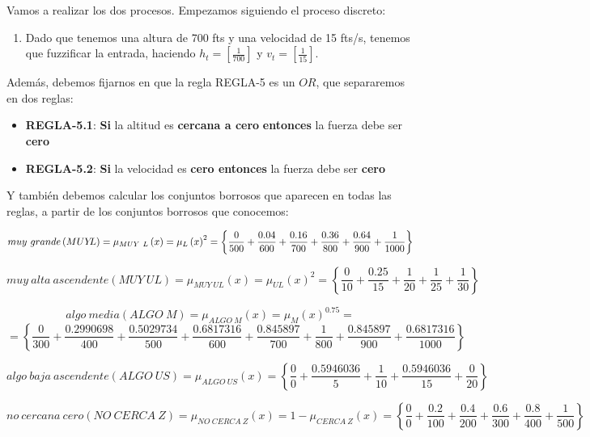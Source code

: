 \documentclass[
]{article}
\providecommand{\tightlist}{%
  \setlength{\itemsep}{0pt}\setlength{\parskip}{0pt}}
\begin{document}
Vamos a realizar los dos procesos. Empezamos siguiendo el proceso
discreto:

\begin{enumerate}
\def\labelenumi{\arabic{enumi}.}
\tightlist
\item
  Dado que tenemos una altura de 700 fts y una velocidad de 15 fts/s,
  tenemos que fuzzificar la entrada, haciendo
  \(h_{t}=\left[\frac{1}{700}\right]\) y
  \(v_{t}=\left[\frac{1}{15}\right]\).
\end{enumerate}

Además, debemos fijarnos en que la regla REGLA-5 es un \(OR\), que
separaremos en dos reglas:

\begin{itemize}
\tightlist
\item
  \textbf{REGLA-5.1}: \textbf{Si} la altitud es \textbf{cercana a cero}
  \textbf{entonces} la fuerza debe ser \textbf{cero}
\item
  \textbf{REGLA-5.2}: \textbf{Si} la velocidad es \textbf{cero entonces}
  la fuerza debe ser \textbf{cero}
\end{itemize}

Y también debemos calcular los conjuntos borrosos que aparecen en todas
las reglas, a partir de los conjuntos borrosos que conocemos:

\[muy\ grande\left(MUY\negthickspace L\right)=\mu_{MUY\ L}\left(x\right)=\mu_{L}\left(x\right)^{2}=\left\{ \frac{0}{500}+\frac{0.04}{600}+\frac{0.16}{700}+\frac{0.36}{800}+\frac{0.64}{900}+\frac{1}{1000}\right\} \]

\[muy\ alta\ ascendente\left(MUY\ UL\right)=\mu_{MUY\ UL}\left(x\right)=\mu_{UL}\left(x\right)^{2}=\left\{ \frac{0}{10}+\frac{0.25}{15}+\frac{1}{20}+\frac{1}{25}+\frac{1}{30}\right\} \]

\[algo\ media\left(ALGO\ M\right)=\mu_{ALGO\ M}\left(x\right)=\mu_{M}\left(x\right)^{0.75}= \]
\[=\left\{ \frac{0}{300}+\frac{0.2990698}{400}+\frac{0.5029734}{500}+\frac{0.6817316}{600}+\frac{0.845897}{700}+\frac{1}{800}+\frac{0.845897}{900}+\frac{0.6817316}{1000}\right\}\]

\[algo\ baja\ ascendente\left(ALGO\ US\right)=\mu_{ALGO\ US}\left(x\right)=\left\{ \frac{0}{0}+\frac{0.5946036}{5}+\frac{1}{10}+\frac{0.5946036}{15}+\frac{0}{20}\right\}\]

\[no\ cercana\ cero\left(NO\ CERCA\ Z\right)=\mu_{NO\ CERCA\ Z}\left(x\right)=1-\mu_{CERCA\ Z}\left(x\right)=\left\{ \frac{0}{0}+\frac{0.2}{100}+\frac{0.4}{200}+\frac{0.6}{300}+\frac{0.8}{400}+\frac{1}{500}\right\} \]
\end{document}
